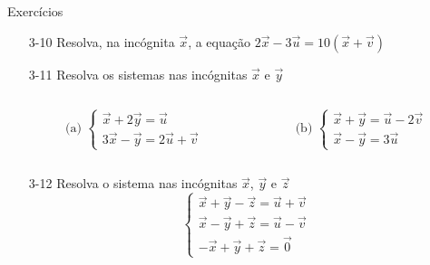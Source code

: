 \begin{frame}{Exercícios}
    \begin{itemize}
        \item[3-10] Resolva, na incógnita \(\vec{x}\), a equação \(2 \vec{x}-3 \vec{u}=10 ( \vec{x} + \vec{v}) \)
        \item[3-11] Resolva os sistemas nas incógnitas \(\vec{x}\) e \(\vec{y}\)
            \begin{columns}
                \begin{column}{0.4\textwidth}
                    \[
                        \text{(a) } \begin{cases}
                            \vec{x}+2 \vec{y}= \vec{u} \\
                            3 \vec{x} - \vec{y} = 2 \vec{u} + \vec{v}
                        \end{cases}
                    \]
                \end{column}

                \begin{column}{0.4\textwidth}
                    \[
                        \text{(b) } \begin{cases}
                            \vec{x} + \vec{y}= \vec{u}- 2\vec{v} \\
                            \vec{x}- \vec{y} = 3 \vec{u}
                        \end{cases}
                    \]
                \end{column}
            \end{columns}

        \item[3-12] Resolva o sistema nas incógnitas \(\vec{x}\), \(\vec{y}\) e \(\vec{z}\)
            \[
                \begin{cases}
                    \vec{x}+ \vec{y} - \vec{z} = \vec{u} + \vec{v} \\
                    \vec{x} - \vec{y} + \vec{z} = \vec{u} - \vec{v} \\
                    -\vec{x} + \vec{y} + \vec{z} = \vec{0}
                \end{cases}
            \]
    \end{itemize}
\end{frame}

